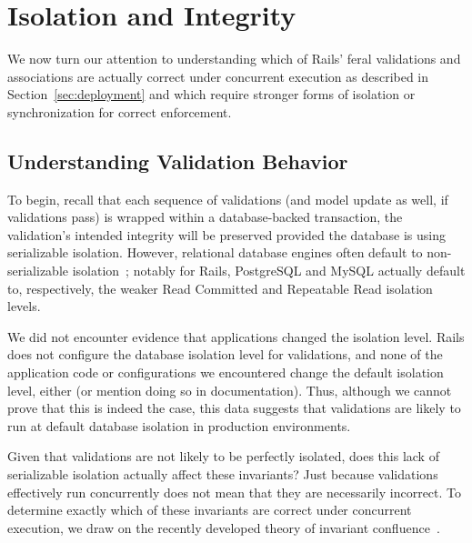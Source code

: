 
\section{Isolation and Integrity}
\label{sec:apps}

We now turn our attention to understanding which of Rails' feral
validations and associations are actually correct under concurrent
execution as described in Section~\ref{sec:deployment} and which
require stronger forms of isolation or synchronization for correct
enforcement.

\subsection{Understanding Validation Behavior}

To begin, recall that each sequence of validations (and model update
as well, if validations pass) is wrapped within a database-backed
transaction, the validation's intended integrity will be preserved
provided the database is using serializable isolation. However,
relational database engines often default to non-serializable
isolation~\cite{hat-vldb}; notably for Rails, PostgreSQL and MySQL
actually default to, respectively, the weaker Read Committed and
Repeatable Read isolation levels.

We did not encounter evidence that applications changed the isolation
level. Rails does not configure the database isolation level for
validations, and none of the application code or configurations we
encountered change the default isolation level, either (or mention
doing so in documentation). Thus, although we cannot prove that this
is indeed the case, this data suggests that validations are likely
to run at default database isolation in production environments.

 Given that validations are
not likely to be perfectly isolated, does this lack of serializable
isolation actually affect these invariants?  Just because validations
effectively run concurrently does not mean that they are necessarily
incorrect. To determine exactly which of these invariants are correct
under concurrent execution, we draw on the recently developed theory
of invariant confluence~\cite{coord-avoid}.

